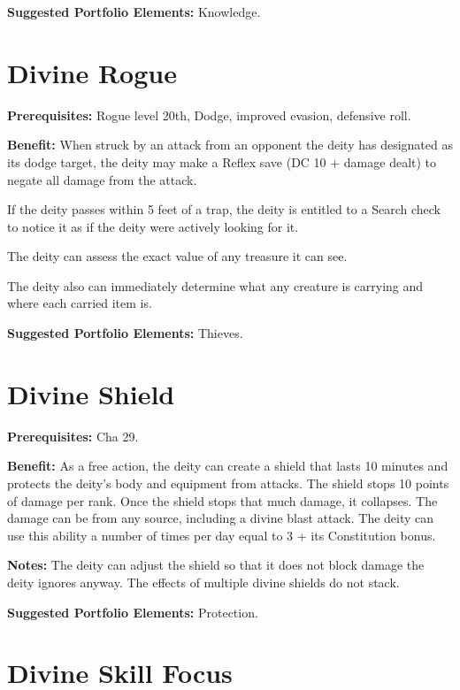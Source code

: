 \documentclass{article}
\begin{document}
\textbf{Suggested Portfolio Elements:} Knowledge.

\vspace{12pt}
\section*{Divine Rogue}

\textbf{Prerequisites:} Rogue level 20th, Dodge, improved evasion, defensive roll.

\textbf{Benefit:} When struck by an attack from an opponent the deity has designated 
as its dodge target, the deity may make a Reflex save (DC 10 + damage dealt) to 
negate all damage from the attack.

If the deity passes within 5 feet of a trap, the deity is entitled to a Search 
check to notice it as if the deity were actively looking for it.

The deity can assess the exact value of any treasure it can see.

The deity also can immediately determine what any creature is carrying and where 
each carried item is.

\textbf{Suggested Portfolio Elements:} Thieves.

\vspace{12pt}
\section*{Divine Shield}

\textbf{Prerequisites:} Cha 29.

\textbf{Benefit:} As a free action, the deity can create a shield that lasts 10 
minutes and protects the deity's body and equipment from attacks. The shield stops 
10 points of damage per rank. Once the shield stops that much damage, it collapses. 
The damage can be from any source, including a divine blast attack. The deity can 
use this ability a number of times per day equal to 3 + its Constitution bonus.

\textbf{Notes:} The deity can adjust the shield so that it does not block damage 
the deity ignores anyway. The effects of multiple divine shields do not stack.

\textbf{Suggested Portfolio Elements:} Protection.

\vspace{12pt}
\section*{Divine Skill Focus}
\end{document}
